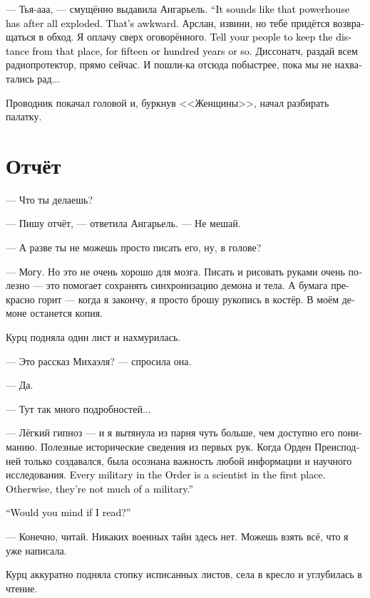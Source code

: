 \documentclass[a4paper,12pt,fleqn]{book}\usepackage{cooltooltips}\usepackage{polyglossia}\setdefaultlanguage[babelshorthands=true]{russian}\setotherlanguage{english}\defaultfontfeatures{Ligatures=TeX,Mapping=tex-text} \usepackage{xcolor}\definecolor{lightgray}{HTML}{bbbbbb}\color{lightgray}\newcommand{\ml}[3]{\textenglish{\textcolor{black}{#3}}}
\begin{document}
--- Тья-ааа, --- смущённо выдавила Ангарьель.
\ml{$0$}
{--- Похоже, тот генератор всё-таки рванул.}
{``It sounds like that powerhouse has after all exploded.}
\ml{$0$}
{Неудобно вышло.}
{That's awkward.}
Арслан, извини, но тебе придётся возвращаться в обход.
Я оплачу сверх оговорённого.
\ml{$0$}
{Скажи своим, чтобы ближайшие пятьдесят-сто лет там не ходили.}
{Tell your people to keep the distance from that place, for fifteen or hundred years or so.}
Диссонатч, раздай всем радиопротектор, прямо сейчас.
И пошли-ка отсюда побыстрее, пока мы не нахватались рад...

Проводник покачал головой и, буркнув <<Женщины>>, начал разбирать палатку.

\section{Отчёт}

--- Что ты делаешь?

--- Пишу отчёт, --- ответила Ангарьель.
--- Не мешай.

--- А разве ты не можешь просто писать его, ну, в голове?

--- Могу.
Но это не очень хорошо для мозга.
Писать и рисовать руками очень полезно --- это помогает сохранять синхронизацию демона и тела.
А бумага прекрасно горит --- когда я закончу, я просто брошу рукопись в костёр.
В моём демоне останется копия.

Курц подняла один лист и нахмурилась.

--- Это рассказ Михаэля? --- спросила она.

--- Да.

--- Тут так много подробностей...

--- Лёгкий гипноз --- и я вытянула из парня чуть больше, чем доступно его пониманию.
Полезные исторические сведения из первых рук.
Когда Орден Преисподней только создавался, была осознана важность любой информации и научного исследования.
\ml{$0$}
{Каждый военный в Ордене --- это в первую очередь учёный.}
{Every military in the Order is a scientist in the first place.}
\ml{$0$}
{Если же нет --- он военный не ахти.}
{Otherwise, they're not much of a military.''}

\ml{$0$}
{--- Ты не против, если я почитаю?}
{``Would you mind if I read?''}

--- Конечно, читай.
Никаких военных тайн здесь нет.
Можешь взять всё, что я уже написала.

Курц аккуратно подняла стопку исписанных листов, села в кресло и углубилась в чтение.
\end{document}
